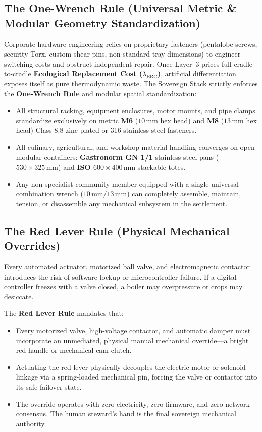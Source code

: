\subsection{The One-Wrench Rule (Universal Metric \& Modular Geometry Standardization)}
Corporate hardware engineering relies on proprietary fasteners (pentalobe screws, security Torx, custom shear pins, non-standard tray dimensions) to engineer switching costs and obstruct independent repair. Once Layer~3 prices full cradle-to-cradle \textbf{Ecological Replacement Cost ($\lambda_{\mathrm{ERC}}$)}, artificial differentiation exposes itself as pure thermodynamic waste. The Sovereign Stack strictly enforces the \textbf{One-Wrench Rule} and modular spatial standardization:
\begin{itemize}
    \item All structural racking, equipment enclosures, motor mounts, and pipe clamps standardize exclusively on metric \textbf{M6} ($10\,\mathrm{mm}$ hex head) and \textbf{M8} ($13\,\mathrm{mm}$ hex head) Class 8.8 zinc-plated or 316 stainless steel fasteners.
    \item All culinary, agricultural, and workshop material handling converges on open modular containers: \textbf{Gastronorm GN 1/1} stainless steel pans ($530 \times 325\,\mathrm{mm}$) and \textbf{ISO $600 \times 400\,\mathrm{mm}$} stackable totes.
    \item Any non-specialist community member equipped with a single universal combination wrench ($10\,\mathrm{mm} / 13\,\mathrm{mm}$) can completely assemble, maintain, tension, or disassemble any mechanical subsystem in the settlement.
\end{itemize}

\subsection{The Red Lever Rule (Physical Mechanical Overrides)}
Every automated actuator, motorized ball valve, and electromagnetic contactor introduces the risk of software lockup or microcontroller failure. If a digital controller freezes with a valve closed, a boiler may overpressure or crops may desiccate.

The \textbf{Red Lever Rule} mandates that:
\begin{itemize}
    \item Every motorized valve, high-voltage contactor, and automatic damper must incorporate an unmediated, physical manual mechanical override---a bright red handle or mechanical cam clutch.
    \item Actuating the red lever physically decouples the electric motor or solenoid linkage via a spring-loaded mechanical pin, forcing the valve or contactor into its safe failover state.
    \item The override operates with zero electricity, zero firmware, and zero network consensus. The human steward's hand is the final sovereign mechanical authority.
\end{itemize}

